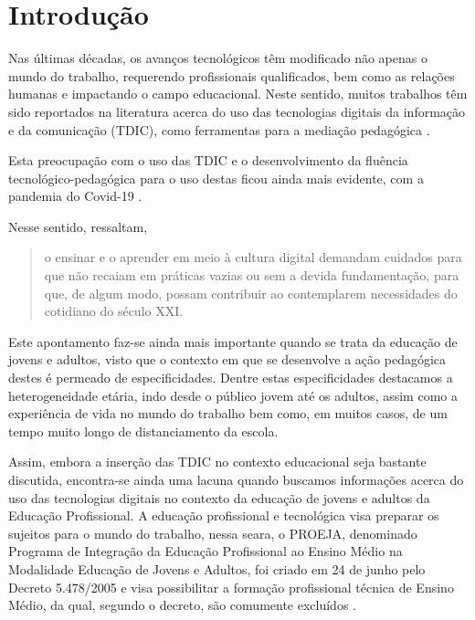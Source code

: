 \section{Introdução}\label{sec-intro}

Nas últimas décadas, os avanços tecnológicos têm modificado não apenas o
mundo do trabalho, requerendo profissionais qualificados, bem como as
relações humanas e impactando o campo educacional. Neste sentido, muitos
trabalhos têm sido reportados na literatura acerca do uso das
tecnologias digitais da informação e da comunicação (TDIC), como
ferramentas para a mediação pedagógica \cite{Peripolli2022, Pires2024}.

Esta preocupação com o uso das TDIC e o desenvolvimento da fluência
tecnológico-pedagógica para o uso destas ficou ainda mais evidente, com
a pandemia do Covid-19 \cite{Joaquim2021, Cleophas2022}.

Nesse sentido, \textcite[p. 2]{Oliveira2022} ressaltam,

\begin{quote}
o ensinar e o aprender em meio à cultura digital demandam cuidados para
que não recaiam em práticas vazias ou sem a devida fundamentação, para
que, de algum modo, possam contribuir ao contemplarem necessidades do
cotidiano do século XXI.
\end{quote}


Este apontamento faz-se ainda mais importante quando se trata da
educação de jovens e adultos, visto que o contexto em que se desenvolve
a ação pedagógica destes é permeado de especificidades. Dentre estas
especificidades destacamos a heterogeneidade etária, indo desde o
público jovem até os adultos, assim como a experiência de vida no mundo
do trabalho bem como, em muitos casos, de um tempo muito longo de
distanciamento da escola.

Assim, embora a inserção das TDIC no contexto educacional seja bastante
discutida, encontra-se ainda uma lacuna quando buscamos informações
acerca do uso das tecnologias digitais no contexto da educação de jovens
e adultos da Educação Profissional. A educação profissional e
tecnológica visa preparar os sujeitos para o mundo do trabalho, nessa
seara, o PROEJA, denominado Programa de Integração da Educação
Profissional ao Ensino Médio na Modalidade Educação de Jovens e Adultos,
foi criado em 24 de junho pelo Decreto 5.478/2005 e visa possibilitar a
formação profissional técnica de Ensino Médio, da qual, segundo o
decreto, são comumente excluídos \cite{Brasil2005}.

